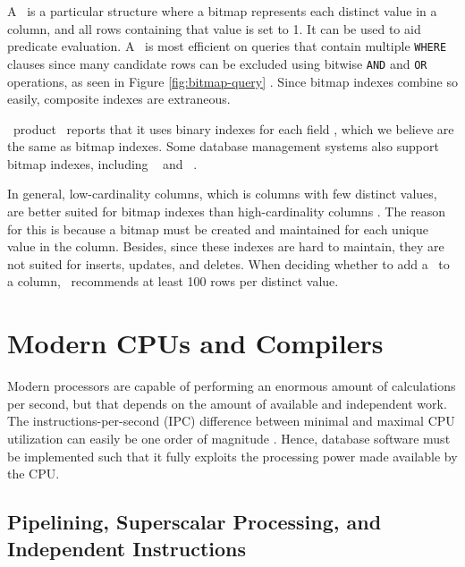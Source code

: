 
A \biti~is a particular structure where a bitmap represents each distinct value in a column, and all rows containing that value is set to 1. It can be used to aid predicate evaluation. A \biti~is most efficient on queries that contain multiple \texttt{WHERE} clauses since many candidate rows can be excluded using bitwise \texttt{AND} and \texttt{OR} operations, as seen in Figure \ref{fig:bitmap-query} \cite{noauthor_undated-hp}. Since bitmap indexes combine so easily, composite indexes are extraneous. 

\bd~product \qlikview~reports that it uses binary indexes for each field \cite{Qlik2011-ef}, which we believe are the same as bitmap indexes. Some database management systems also support bitmap indexes, including \oracle~\cite{noauthor_undated-hp} and \ibm~\cite{Raman2013-em}.

In general, low-cardinality columns, which is columns with few distinct values, are better suited for bitmap indexes than high-cardinality columns \cite{noauthor_undated-hp}. The reason for this is because a bitmap must be created and maintained for each unique value in the column. Besides, since these indexes are hard to maintain, they are not suited for inserts, updates, and deletes. When deciding whether to add a \biti~to a column, \oracle~recommends at least 100 rows per distinct value. 


\section{Modern CPUs and Compilers}
\label{sec:Modern CPUs and Compilers}
Modern processors are capable of performing an enormous amount of calculations per second, but that depends on the amount of available and independent work. The instructions-per-second (IPC) difference between minimal and maximal CPU utilization can easily be one order of magnitude \cite{Boncz2005-wj}. Hence, database software must be implemented such that it fully exploits the processing power made available by the CPU.

\subsection{Pipelining, Superscalar Processing, and Independent Instructions}
\label{sub:Pipelining, Superscalar Processing, and Independent Instructions}

